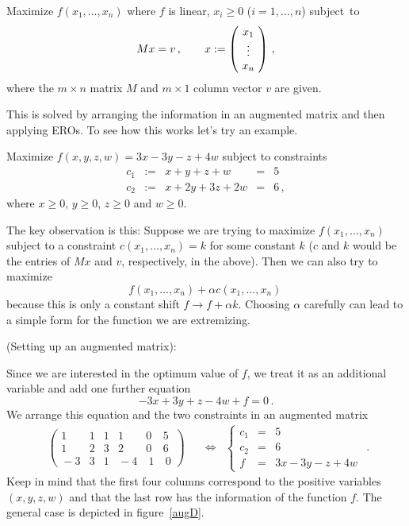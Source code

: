 \begin{problem}
Maximize $f(x_1,\ldots,x_n)$ where $f$ is linear, $x_i\geq 0$ ($i=1,\ldots, n$) subject~to  
\[
Mx = v\, ,\qquad x:=\left(\!\begin{array}{c} x_1\\\vdots \\ x_n \end{array}\!\right)\, ,
\]
where the $m\times n$ matrix $M$ and $m\times 1$ column vector $v$ are given.
\end{problem}
 
This is solved by arranging the information in an augmented matrix and then applying EROs.
To see how this works let's try an example.

\begin{example}\label{stdprob}
Maximize $f(x,y,z,w)=3x-3y-z+4w$ subject to constraints
\begin{equation*}
\begin{array}{rcccl}
c_1&:=&x+y+z+w&=&5\\[2mm]
c_2&:=&x+2y+3z+2w&=&6\, ,
\end{array}
\end{equation*}
where $x\geq0$, $y\geq0$, $z\geq0$ and $w\geq 0$.
\end{example}
  The key observation is this: Suppose we are trying to maximize $f(x_1,\ldots,x_n)$ subject to 
  a constraint $c(x_1,\ldots,x_n)=k$ for some constant $k$ ($c$ and $k$ would  be the entries of 
  $Mx$ and $v$, respectively, in the above). Then we can also try to maximize
  \[
 f(x_1,\ldots,x_n)+\alpha c(x_1,\ldots,x_n)\, 
  \]
  because this is only a constant shift $f\to f+\alpha k$. Choosing $\alpha$ carefully can lead to a simple form for the function we are extremizing.



\begin{example} (Setting up an augmented matrix):

Since we are interested in the optimum value of $f$, we treat it as an additional variable and add one further equation
\[
-3x+3y+z-4w+f=0\, .
\]
We arrange this equation and the two constraints in an augmented matrix
\[
\begin{array}{ccc}
\left(\begin{array}{rrrrr|r}
1&1&1&1&0&5\\[1mm]
1&2&3&2&0&6\\\hline
\!-3&3&1&\!\!-4&\ 1&\ 0
\end{array}\right)
\quad &\Leftrightarrow &%
\left\{
\begin{array}{lcl}
c_1&=&5\\[1mm]
c_2&=&6\\[1mm]
f&=&3x-3y-z+4w
\end{array}\right.
\end{array}.
\]
Keep in mind that the first four columns correspond to the positive variables $(x,y,z,w)$ and that
the last row has the information of the function $f$. The general case is depicted in figure~\ref{augD}.
\end{example}

